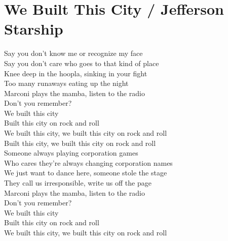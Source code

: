 \section{We Built This City / Jefferson Starship}\label{sec:webuiltthiscity}

\Gmajor
\Cmajor
\Fmajor
\DmajorEasy
\Eminor
\CMajorseven
\Bminor

Say you don't know me or recognize my face\\
Say you don't care who goes to that kind of place\\
Knee deep in the hoopla, sinking in your fight\\
Too many runaways eating up the night\\
 Marconi plays the mamba, listen to the radio \\
Don't you remember? \\
We built this city  \\
Built this city on rock and  roll \\
We built this city, we built this city on rock and roll\\
Built this city, we built this city on rock and roll\\
 Someone always playing corporation games \\
Who cares they're always changing corporation names \\
We just want to dance here, someone stole the stage \\
They call us irresponsible, write us off the page \\
 Marconi plays the mamba, listen to the radio \\
Don't you remember? \\
We built this city  \\
Built this city on rock and  roll \\
We built this city, we built this city on rock and roll\\
